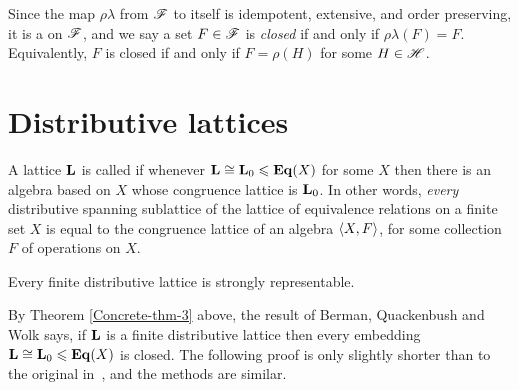 Since the map $\rho \lambda$ from $\mathscr{F}$ to itself is idempotent, extensive, %
and order preserving, it is a 
on $\mathscr{F}$, and we say a set $F\in \mathscr{F}$ is
\emph{closed} if and only if $\rho\lambda(F) = F$. Equivalently,
$F$ is closed if and only if $F = \rho(H)$ for some $H\in \mathscr{H}$.



\section{Distributive lattices}
\label{sec:distr-latt}



A lattice $\mathbf{L}$ is called 
if whenever $\mathbf{L} \cong \mathbf{L}_0 \leqslant \mathbf{Eq}(X)$ for some $X$ then there is an algebra based on $X$
whose congruence lattice is $\mathbf{L}_0$.  In other words, \emph{every} 
distributive spanning sublattice of the lattice of equivalence relations on a finite set
$X$ is equal to the congruence lattice of an algebra $\langle X, F\rangle$, for some
collection $F$ of operations on $X$.

  
\begin{theorem}
  Every finite distributive lattice is strongly representable.
\end{theorem}

\begin{remarks}
  By Theorem \ref{Concrete-thm-3} above, the result of Berman, Quackenbush and
  Wolk says, if $\mathbf{L}$ is a finite distributive lattice then every embedding
  $\mathbf{L}\cong \mathbf{L}_0\leqslant \mathbf{Eq}(X)$ is closed. The following proof is only slightly
  shorter than to the original in~\cite{Quack:1971}, and the methods are similar. 
\end{remarks}


